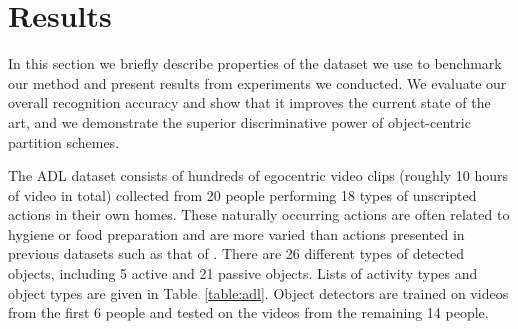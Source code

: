 \documentclass[12pt]{article} %
\begin{document}
\section{Results}
  In this section we briefly describe properties of the dataset we use to
  benchmark our method and present results from experiments we conducted. We
  evaluate our overall recognition accuracy and show that it improves the
  current state of the art, and we demonstrate the superior discriminative
  power of object-centric partition schemes.

  The ADL dataset consists of hundreds of egocentric video clips
	(roughly 10 hours of video in total) collected from 20 people performing
	18 types of unscripted actions in their own homes. These naturally
  occurring
  actions are often related to hygiene or food preparation and are more
  varied than actions presented in previous datasets such as that of \cite{Fathi11}.
  There are 26 different 
	types of detected objects, including 5 active and 21 passive objects. 
  Lists of activity types and object types are given in Table~\ref{table:adl}.
  Object detectors are trained on videos from the
  first 6 people and tested on the videos from the remaining 14 people.
\end{document}
